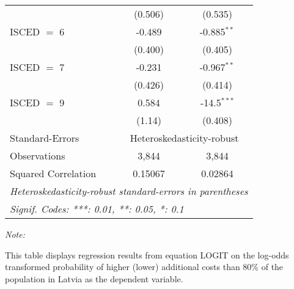 \begin{table}[htbp!]
\begin{adjustbox}{width = 1\textwidth, max height = 0.95\textheight, center}
\begin{threeparttable}[b]
\begin{tabular}{lcc}
                                 & (0.506)        & (0.535)\\   
            ISCED $=$ 6          & -0.489         & -0.885$^{**}$\\   
                                 & (0.400)        & (0.405)\\   
            ISCED $=$ 7          & -0.231         & -0.967$^{**}$\\   
                                 & (0.426)        & (0.414)\\   
            ISCED $=$ 9          & 0.584          & -14.5$^{***}$\\   
                                 & (1.14)         & (0.408)\\   
            \midrule 
            Standard-Errors & \multicolumn{2}{c}{Heteroskedasticity-robust} \\ 
            Observations         & 3,844          & 3,844\\  
            Squared Correlation  & 0.15067        & 0.02864\\  
            \midrule \midrule
            \multicolumn{3}{l}{\emph{Heteroskedasticity-robust standard-errors in parentheses}}\\
            \multicolumn{3}{l}{\emph{Signif. Codes: ***: 0.01, **: 0.05, *: 0.1}}\\
         \end{tabular}
         
         \begin{tablenotes}\item \medskip \textit{Note:}
            \item This table displays regression results from equation LOGIT on the log-odds transformed probability of higher (lower) additional costs than 80\% of the population in Latvia as the dependent variable. 
         \end{tablenotes}
      \end{threeparttable}
   \end{adjustbox}
\end{table}


